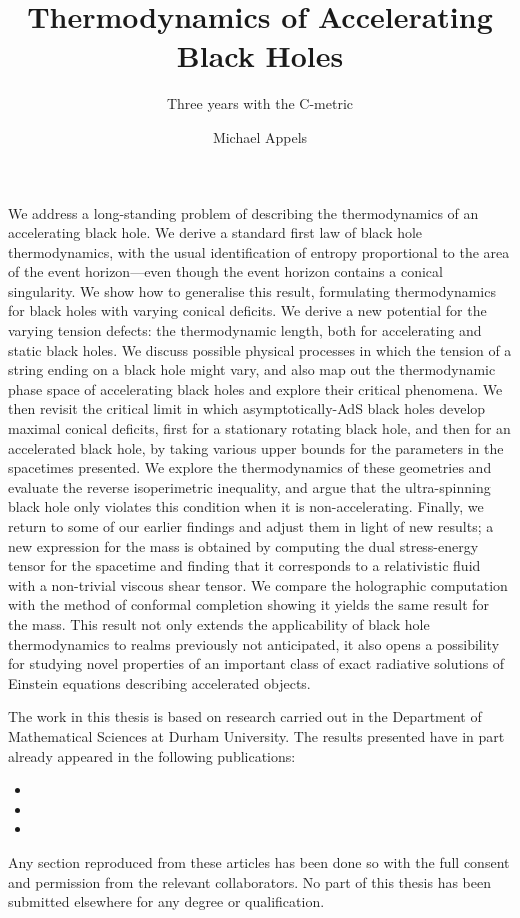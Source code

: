 \documentclass[
twoside,
openright,
frontopenright,
]{dmathesis}
\begin{document}
\title{Thermodynamics of Accelerating Black Holes}
\subtitle{Three years with the C-metric}
\author{Michael Appels}
\maketitlepage*

\begin{abstract*}
  We address a long-standing problem of describing the thermodynamics of an
  accelerating black hole. We derive a standard first law of black hole
  thermodynamics, with the usual identification of entropy proportional to the
  area of the event horizon---even though the event horizon contains a conical
  singularity. We show how to generalise this result, formulating thermodynamics
  for black holes with varying conical deficits. We derive a new potential for
  the varying tension defects: the thermodynamic length, both for accelerating
  and static black holes. We discuss possible physical processes in which the
  tension of a string ending on a black hole might vary, and also map out the
  thermodynamic phase space of accelerating black holes and explore their
  critical phenomena. We then revisit the critical limit in which
  asymptotically-AdS black holes develop maximal conical deficits, first for a
  stationary rotating black hole, and then for an accelerated black hole, by
  taking various upper bounds for the parameters in the spacetimes presented. We
  explore the thermodynamics of these geometries and evaluate the reverse
  isoperimetric inequality, and argue that the ultra-spinning black hole only
  violates this condition when it is non-accelerating. Finally, we return to
  some of our earlier findings and adjust them in light of new results; a new
  expression for the mass is obtained by computing the dual stress-energy tensor
  for the spacetime and finding that it corresponds to a relativistic fluid with
  a non-trivial viscous shear tensor. We compare the holographic computation
  with the method of conformal completion showing it yields the same result for
  the mass. This result not only extends the applicability of black hole
  thermodynamics to realms previously not anticipated, it also opens a
  possibility for studying novel properties of an important class of exact
  radiative solutions of Einstein equations describing accelerated objects.
%
\end{abstract*}

\begin{declaration*}
%
  The work in this thesis is based on research carried out in the Department of
  Mathematical Sciences at Durham University. The results presented have in part
  already appeared in the following publications:
  \begin{itemize}
  \item {}
  \item {}
  \item {}
  \end{itemize}
  Any section reproduced from these articles has been done so with the full
  consent and permission from the relevant collaborators. No part of this thesis
  has been submitted elsewhere for any degree or qualification.
%
\end{declaration*}
\end{document}
